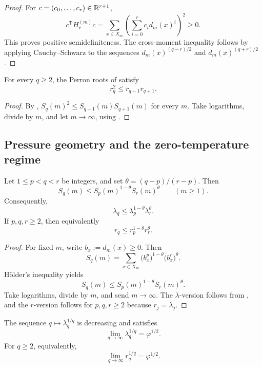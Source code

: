 \begin{proof}
For \(c=(c_0,\dots,c_r)\in\mathbb{R}^{r+1}\),
\[
  c^{\mathsf T}H_r^{(m)}c
  =
  \sum_{x\in X_m}\left(\sum_{i=0}^r c_i d_m(x)^i\right)^2\ge 0.
\]
This proves positive semidefiniteness.  The cross-moment inequality follows by
applying Cauchy--Schwarz to the sequences
\(d_m(x)^{(q-r)/2}\) and \(d_m(x)^{(q+r)/2}\).
\end{proof}

\begin{corollary}
\label{cor:cross-q-logconvex}
For every \(q\ge 2\), the Perron roots of  satisfy
\[
  r_q^2\le r_{q-1}r_{q+1}.
\]
\end{corollary}

\begin{proof}
By ,
\(S_q(m)^2\le S_{q-1}(m)S_{q+1}(m)\) for every \(m\).  Take logarithms, divide
by \(m\), and let \(m\to\infty\), using .
\end{proof}

\subsection{Pressure geometry and the zero-temperature regime}

\begin{theorem}
\label{thm:global-pressure-convexity}
Let \(1\le p<q<r\) be integers, and set \(\theta=(q-p)/(r-p)\).  Then
\[
  S_q(m)\le S_p(m)^{1-\theta}S_r(m)^\theta
  \qquad (m\ge 1).
\]
Consequently,
\[
  \lambda_q\le \lambda_p^{1-\theta}\lambda_r^\theta.
\]
If \(p,q,r\ge 2\), then equivalently
\[
  r_q\le r_p^{1-\theta}r_r^\theta.
\]
\end{theorem}

\begin{proof}
For fixed \(m\), write \(b_x:=d_m(x)\ge 0\).  Then
\[
  S_q(m)
  =
  \sum_{x\in X_m}
  \bigl(b_x^p\bigr)^{1-\theta}\bigl(b_x^r\bigr)^\theta.
\]
H\"older's inequality yields
\[
  S_q(m)\le S_p(m)^{1-\theta}S_r(m)^\theta.
\]
Take logarithms, divide by \(m\), and send \(m\to\infty\).  The
\(\lambda\)-version follows from , and the
\(r\)-version follows for \(p,q,r\ge 2\) because \(r_j=\lambda_j\).
\end{proof}

\begin{corollary}
\label{cor:renyi-endpoint}
The sequence \(q\mapsto \lambda_q^{1/q}\) is decreasing and satisfies
\[
  \lim_{q\to\infty}\lambda_q^{1/q}=\varphi^{1/2}.
\]
For \(q\ge 2\), equivalently,
\[
  \lim_{q\to\infty}r_q^{1/q}=\varphi^{1/2}.
\]
\end{corollary}

